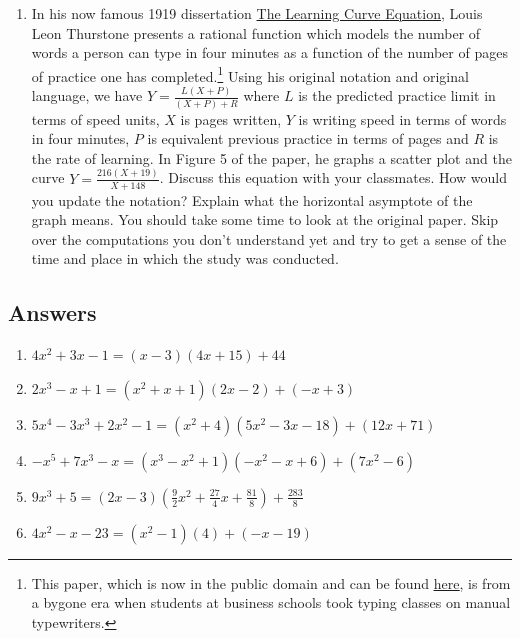 \begin{enumerate}
\item {}  In his now famous 1919 dissertation \underline{The Learning Curve Equation}, Louis Leon Thurstone presents a rational function which models the number of words a person can type in four minutes as a function of the number of pages of practice one has completed.\footnote{This paper, which is now in the public domain and can be found  \href{http://bit.ly/2uNaUBa}{\underline{here}}, is from a bygone era when students at business schools took typing classes on manual typewriters.} Using his original notation and original language, we have $Y = \frac{L(X + P)}{(X + P) + R}$ where $L$ is the predicted practice limit in terms of speed units, $X$ is pages written, $Y$ is writing speed in terms of words in four minutes, $P$ is equivalent previous practice in terms of pages and $R$ is the rate of learning. In Figure 5 of the paper, he graphs a scatter plot and the curve $Y = \frac{216(X + 19)}{X + 148}$.  Discuss this equation with your classmates.  How would you update the notation?  Explain what the horizontal asymptote of the graph means.  You should take some time to look at the original paper. Skip over the computations you don't understand yet and try to get a sense of the time and place in which the study was conducted.

\end{enumerate}

\newpage

\subsection{Answers}

\begin{enumerate}
\item $4x^2+3x-1 = (x-3)(4x+15) + 44$
\item $2x^3-x+1 = \left(x^2+x+1\right)(2x-2)+(-x+3)$
\item $5x^{4} - 3x^{3} + 2x^{2} - 1 = \left(x^{2} + 4 \right) \left(5x^{2} - 3x - 18 \right) + (12x + 71)$
\item $-x^{5} + 7x^{3} - x = \left(x^{3} - x^{2} + 1 \right) \left(-x^{2} - x + 6 \right) + \left(7x^{2} - 6 \right)$
\item $9x^{3} + 5 =(2x - 3) \left(\frac{9}{2}x^{2} + \frac{27}{4}x + \frac{81}{8} \right) + \frac{283}{8}$
\item $4x^2 - x - 23 = \left(x^{2} - 1 \right)(4) + (-x - 19)$
\setcounter{HW}{\value{enumi}}
\end{enumerate}


